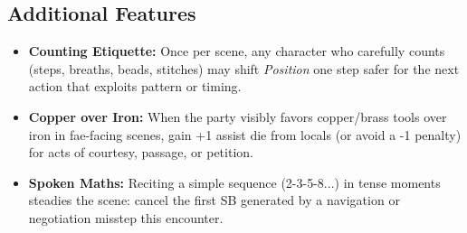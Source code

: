 \subsection*{Additional Features}
\begin{itemize}
\item \textbf{Counting Etiquette:} Once per scene, any character who carefully counts (steps, breaths, beads, stitches) may shift \emph{Position} one step safer for the next action that exploits pattern or timing.
\item \textbf{Copper over Iron:} When the party visibly favors copper/brass tools over iron in fae-facing scenes, gain +1 assist die from locals (or avoid a -1 penalty) for acts of courtesy, passage, or petition.
\item \textbf{Spoken Maths:} Reciting a simple sequence (2-3-5-8...) in tense moments steadies the scene: cancel the first SB generated by a navigation or negotiation misstep this encounter.
\end{itemize}

